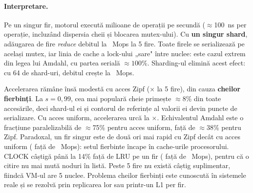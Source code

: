 \paragraph{Interpretare.} Pe un singur fir, motorul execută  milioane de operații pe
secundă ($\approx$100~ns per operație, incluzând dispersia cheii și blocarea mutex-ului). Cu \textbf{un singur
shard}, adăugarea de fire \emph{reduce} debitul la ~Mops la 5 fire. Toate firele se
serializează pe același mutex, iar linia de cache a lock-ului „sare" între nuclee: este cazul extrem din
legea lui Amdahl, cu partea serială $\approx 100\%$. Sharding-ul elimină acest efect: cu 64 de shard-uri,
debitul crește la ~Mops.

Accelerarea rămâne însă modestă cu acces Zipf (× la 5 fire), din cauza
\textbf{cheilor fierbinți}. La $s = 0{,}99$, cea mai populară cheie primește $\approx$8\% din toate accesările,
deci shard-ul ei și contorul de referințe al valorii ei devin puncte de serializare. Cu acces uniform,
accelerarea urcă la ×. Echivalentul Amdahl este o fracțiune paralelizabilă de
$\approx$75\% pentru acces uniform, față de $\approx$38\% pentru Zipf. Paradoxal, un fir singur este de două ori
mai rapid cu Zipf decât cu acces uniform ( față de ~Mops): setul
fierbinte încape în cache-urile procesorului. CLOCK câștigă până la 14\% față de LRU pe un fir ( față de
~Mops), pentru că o citire nu mai mută noduri în listă. Peste 5 fire nu există câștig suplimentar, fiindcă VM-ul are 5 nuclee.
Problema cheilor fierbinți este cunoscută în sistemele reale \cite{memcache-fb} și se rezolvă prin replicarea
lor sau printr-un L1 per fir.
